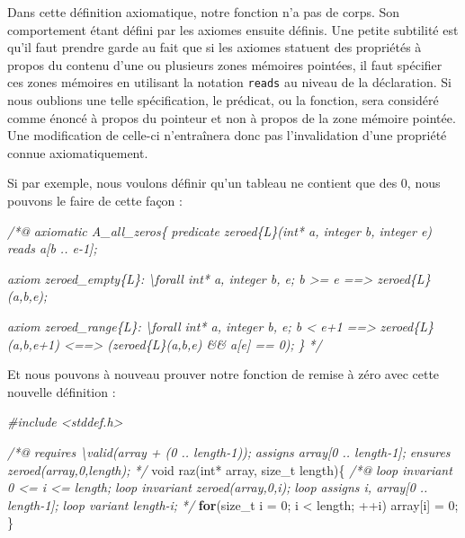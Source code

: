 \documentclass[12pt,francais,]{scrbook}
\newenvironment{Shaded}{}{}
\newcommand{\KeywordTok}[1]{\textcolor[rgb]{0.00,0.44,0.13}{\textbf{{#1}}}}
\newcommand{\DataTypeTok}[1]{\textcolor[rgb]{0.56,0.13,0.00}{{#1}}}
\newcommand{\DecValTok}[1]{\textcolor[rgb]{0.25,0.63,0.44}{{#1}}}
\newcommand{\CommentTok}[1]{\textcolor[rgb]{0.38,0.63,0.69}{\textit{{#1}}}}
\newcommand{\NormalTok}[1]{{#1}}
\begin{document}
Dans cette définition axiomatique, notre fonction n'a pas de corps. Son
comportement étant défini par les axiomes ensuite définis. Une petite
subtilité est qu'il faut prendre garde au fait que si les axiomes
statuent des propriétés à propos du contenu d'une ou plusieurs zones
mémoires pointées, il faut spécifier ces zones mémoires en utilisant la
notation \texttt{reads} au niveau de la déclaration. Si nous oublions
une telle spécification, le prédicat, ou la fonction, sera considéré
comme énoncé à propos du pointeur et non à propos de la zone mémoire
pointée. Une modification de celle-ci n'entraînera donc pas
l'invalidation d'une propriété connue axiomatiquement.

Si par exemple, nous voulons définir qu'un tableau ne contient que des
0, nous pouvons le faire de cette façon :

\begin{footnotesize}\begin{Shaded}
\begin{Highlighting}[]
\CommentTok{/*@}
\CommentTok{  axiomatic A_all_zeros\{}
\CommentTok{    predicate zeroed\{L\}(int* a, integer b, integer e) reads a[b .. e-1];}

\CommentTok{    axiom zeroed_empty\{L\}:}
\CommentTok{      \textbackslash{}forall int* a, integer b, e; b >= e ==> zeroed\{L\}(a,b,e);}

\CommentTok{    axiom zeroed_range\{L\}:}
\CommentTok{      \textbackslash{}forall int* a, integer b, e; b < e+1 ==>}
\CommentTok{        zeroed\{L\}(a,b,e+1) <==> (zeroed\{L\}(a,b,e) && a[e] == 0);}
\CommentTok{  \}}
\CommentTok{*/}
\end{Highlighting}
\end{Shaded}\end{footnotesize}

Et nous pouvons à nouveau prouver notre fonction de remise à zéro avec
cette nouvelle définition :

\begin{footnotesize}\begin{Shaded}
\begin{Highlighting}[]
\CommentTok{#include <stddef.h>}

\CommentTok{/*@}
\CommentTok{  requires \textbackslash{}valid(array + (0 .. length-1));}
\CommentTok{  assigns  array[0 .. length-1];}
\CommentTok{  ensures  zeroed(array,0,length);}
\CommentTok{*/}
\DataTypeTok{void} \NormalTok{raz(}\DataTypeTok{int}\NormalTok{* array, size_t length)\{}
  \CommentTok{/*@}
\CommentTok{    loop invariant 0 <= i <= length;}
\CommentTok{    loop invariant zeroed(array,0,i);}
\CommentTok{    loop assigns i, array[0 .. length-1];}
\CommentTok{    loop variant length-i;}
\CommentTok{  */}
  \KeywordTok{for}\NormalTok{(size_t i = }\DecValTok{0}\NormalTok{; i < length; ++i)}
    \NormalTok{array[i] = }\DecValTok{0}\NormalTok{;}
\NormalTok{\}}
\end{Highlighting}
\end{Shaded}\end{footnotesize}
\end{document}

